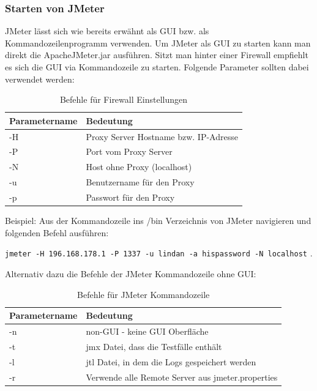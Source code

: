 \documentclass[a4paper,12pt]{article}
\newcommand{\codeInLine}[1]{%
\colorbox{graybackgroundColor}{\lstinline{#1}} %
}
\begin{document}
\subsubsection{Starten von JMeter}
JMeter lässt sich wie bereits erwähnt als GUI bzw. als Kommandozeilenprogramm verwenden.  Um JMeter als GUI zu starten kann man direkt die ApacheJMeter.jar ausführen. Sitzt man hinter einer Firewall empfiehlt es sich die GUI via Kommandozeile zu starten. Folgende Parameter  sollten dabei verwendet werden:

\begin{table}[H]
	\centering
	\begin{tabular}{|l|l|}
		\hline
		\textbf{Parametername} & \textbf{Bedeutung} \\
		\hline
		-H & Proxy Server Hostname bzw. IP-Adresse \\
		-P & Port vom Proxy Server \\
		-N & Host ohne Proxy (localhost) \\ 
		-u & Benutzername für den Proxy \\
		-p & Passwort für den Proxy \\
		\hline
	\end{tabular}
	\caption[tab_parameter_gui]{Befehle für Firewall Einstellungen}
	\label{tab_parameter_gui}
\end{table}

Beispiel: Aus der Kommandozeile ins /bin Verzeichnis von JMeter navigieren und folgenden Befehl ausführen: 

\codeInLine{jmeter -H 196.168.178.1 -P 1337 -u lindan -a hispassword -N localhost}.

Alternativ dazu die Befehle der JMeter Kommandozeile ohne GUI:

\begin{table}[H]
	\centering
	\begin{tabular}{|l|l|}
		\hline
		\textbf{Parametername} & \textbf{Bedeutung} \\
		\hline
		-n & non-GUI - keine GUI Oberfläche \\
		-t & jmx Datei, dass die Testfälle enthält \\
		-l & jtl Datei, in dem die Logs gespeichert werden \\ 
		-r & Verwende alle Remote Server aus jmeter.properties \\
		\hline
	\end{tabular}
	\caption[tab_parameter_non_gui]{Befehle für JMeter Kommandozeile}
	\label{tab_parameter_non_gui}
\end{table}
\end{document}
